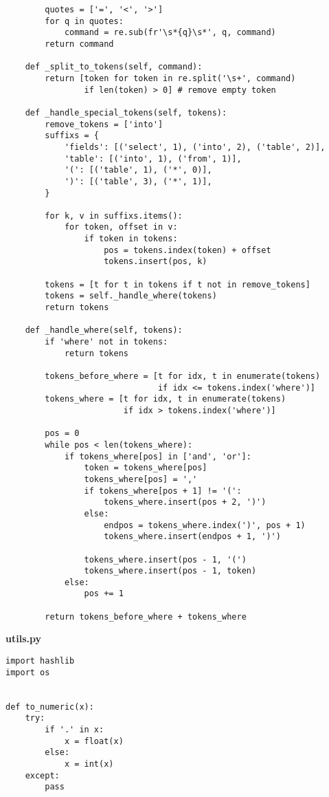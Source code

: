 \begin{appendix}
\begin{lstlisting}
        quotes = ['=', '<', '>']
        for q in quotes:
            command = re.sub(fr'\s*{q}\s*', q, command)
        return command

    def _split_to_tokens(self, command):
        return [token for token in re.split('\s+', command)
                if len(token) > 0] # remove empty token

    def _handle_special_tokens(self, tokens):
        remove_tokens = ['into']
        suffixs = {
            'fields': [('select', 1), ('into', 2), ('table', 2)],
            'table': [('into', 1), ('from', 1)],
            '(': [('table', 1), ('*', 0)],
            ')': [('table', 3), ('*', 1)],
        }

        for k, v in suffixs.items():
            for token, offset in v:
                if token in tokens:
                    pos = tokens.index(token) + offset
                    tokens.insert(pos, k)
        
        tokens = [t for t in tokens if t not in remove_tokens]
        tokens = self._handle_where(tokens)
        return tokens

    def _handle_where(self, tokens):
        if 'where' not in tokens:
            return tokens

        tokens_before_where = [t for idx, t in enumerate(tokens) 
                               if idx <= tokens.index('where')]
        tokens_where = [t for idx, t in enumerate(tokens) 
                        if idx > tokens.index('where')]

        pos = 0
        while pos < len(tokens_where):
            if tokens_where[pos] in ['and', 'or']:
                token = tokens_where[pos]
                tokens_where[pos] = ','
                if tokens_where[pos + 1] != '(':
                    tokens_where.insert(pos + 2, ')')
                else:
                    endpos = tokens_where.index(')', pos + 1)
                    tokens_where.insert(endpos + 1, ')')
                
                tokens_where.insert(pos - 1, '(')
                tokens_where.insert(pos - 1, token)
            else:
                pos += 1
        
        return tokens_before_where + tokens_where
\end{lstlisting}

\textbf{utils.py}

\begin{lstlisting}
import hashlib
import os


def to_numeric(x):
    try:
        if '.' in x:
            x = float(x)
        else:
            x = int(x)
    except:
        pass
    

\end{lstlisting}
\end{appendix}
